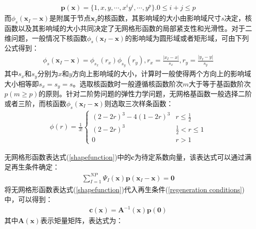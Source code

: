 \begin{equation}
\begin{split}
    \pmb{p}(\pmb{x})=\{1,x,y,\dotsb,x^iy^i,\dotsb,y^p\}.0\le i+j \le p
\end{split}
\end{equation}
而$\phi_s(\pmb{x}_I-\pmb{x})$是附属于节点$\pmb{x}_I$的核函数，其影响域的大小由影响域尺寸$s$决定，核函数以及其影响域的大小共同决定了无网格形函数的局部紧支性和光滑性。对于二维问题，一般情况下核函数$\phi_s(\pmb{x}_I-\pmb{x})$的影响域为圆形域或者矩形域，可由下列公式得到：
\begin{equation}
\begin{split}
    \phi_s(\pmb{x}_I-\pmb{x})=\phi_{s_x}(r_x)\phi_{s_y}(r_y),r_x=\frac{\lvert x_I-x\rvert}{s_x},r_y=\frac{\lvert y_I-y \rvert}{s_y}
\end{split}
\end{equation}
其中$s_x$和$s_y$分别为$x$和$y$方向上影响域的大小，计算时一般使得两个方向上的影响域大小相等即$s_x=s_y=s$。选取核函数时一般遵循核函数阶次$m$大于等于基函数阶次$p(m\ge p)$的原则。针对二阶势问题的弹性力学问题，无网格基函数一般选择二阶或者三阶，而核函数$\phi_s(\pmb{x}_I-\pmb{x})$则选取三次样条函数：
\begin{equation}
\begin{split}
    \phi(r)=\frac{1}{3!}
\begin{cases}
    (2-2r)^3-4(1-2r)^3 &r\le \frac{1}{2}\\
    (2-2r)^3&\frac{1}{2}<r\le 1\\
    0&r>1
\end{cases}
\end{split}
\end{equation}\par
无网格形函数表达式(\ref{shapefunction})中的$\pmb{c}$为待定系数向量，该表达式可以通过满足再生条件确定：
\begin{equation}\label{regeneration conditions}
\begin{split}
    \sum_{I=1}^{N\!P}\Psi_I(\pmb{x})\pmb{p}(\pmb{x}_I-\pmb{x})=\pmb{0}
\end{split}
\end{equation}
将无网格形函数表达式(\ref{shapefunction})代入再生条件(\ref{regeneration conditions})中，可以得到：
\begin{equation}
\begin{split}
    \pmb{c}(\pmb{x})=\pmb{A}^{-1}(\pmb{x})\pmb{p}(\pmb{0})
\end{split}
\end{equation}
其中$\pmb{A}(\pmb{x})$表示矩量矩阵，表达式为：
